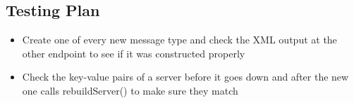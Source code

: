 \subsection{Testing Plan}
\begin{itemize}
\item Create one of every new message type and check the XML output at the other endpoint to see if it was constructed properly
\item Check the key-value pairs of a server before it goes down and after the new one calls rebuildServer() to make sure they match
\end{itemize}